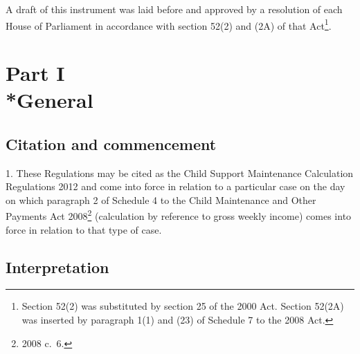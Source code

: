 \documentclass[12pt,a4paper]{article}
\begin{document}
A draft of this instrument was laid before and approved by a resolution of each House of Parliament in accordance with section 52(2) and (2A) of that Act\footnote{Section 52(2) was substituted by section 25 of the 2000 Act. Section 52(2A) was inserted by paragraph 1(1) and (23) of Schedule 7 to the 2008 Act.}. 

{\sloppy

\tableofcontents

}

\bigskip

\setcounter{secnumdepth}{-2}

\section[Part I --- General]{Part I\\*General}

\renewcommand\parthead{--- Part I}

\subsection[1. Citation and commencement]{Citation and commencement}

1.  These Regulations may be cited as the Child Support Maintenance Calculation Regulations 2012 and come into force in relation to a particular case on the day on which paragraph 2 of Schedule 4 to the Child Maintenance and Other Payments Act 2008\footnote{2008 c.~6.} (calculation by reference to gross weekly income) comes into force in relation to that type of case.

\subsection[2. Interpretation]{Interpretation}
\end{document}
